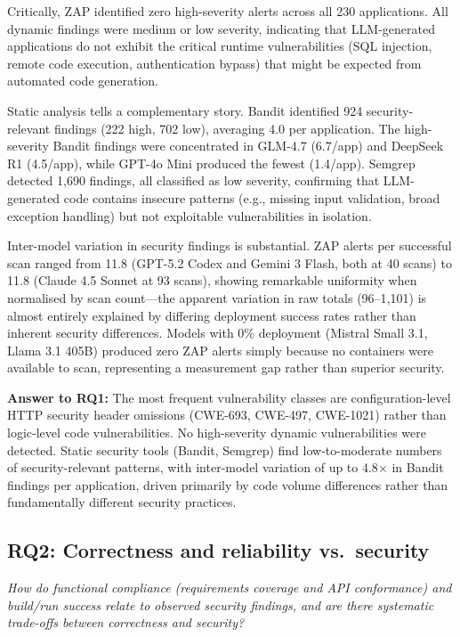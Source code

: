 Critically, ZAP identified zero high-severity alerts across all 230 applications. All dynamic findings were medium or low severity, indicating that LLM-generated applications do not exhibit the critical runtime vulnerabilities (SQL injection, remote code execution, authentication bypass) that might be expected from automated code generation.

Static analysis tells a complementary story. Bandit identified 924 security-relevant findings (222 high, 702 low), averaging 4.0 per application. The high-severity Bandit findings were concentrated in GLM-4.7 (6.7/app) and DeepSeek R1 (4.5/app), while GPT-4o Mini produced the fewest (1.4/app). Semgrep detected 1{,}690 findings, all classified as low severity, confirming that LLM-generated code contains insecure patterns (e.g., missing input validation, broad exception handling) but not exploitable vulnerabilities in isolation.

Inter-model variation in security findings is substantial. ZAP alerts per successful scan ranged from 11.8 (GPT-5.2 Codex and Gemini 3 Flash, both at 40 scans) to 11.8 (Claude 4.5 Sonnet at 93 scans), showing remarkable uniformity when normalised by scan count---the apparent variation in raw totals (96--1{,}101) is almost entirely explained by differing deployment success rates rather than inherent security differences. Models with 0\% deployment (Mistral Small 3.1, Llama 3.1 405B) produced zero ZAP alerts simply because no containers were available to scan, representing a measurement gap rather than superior security.

\textbf{Answer to RQ1:} The most frequent vulnerability classes are configuration-level HTTP security header omissions (CWE-693, CWE-497, CWE-1021) rather than logic-level code vulnerabilities. No high-severity dynamic vulnerabilities were detected. Static security tools (Bandit, Semgrep) find low-to-moderate numbers of security-relevant patterns, with inter-model variation of up to 4.8$\times$ in Bandit findings per application, driven primarily by code volume differences rather than fundamentally different security practices.

\subsection{RQ2: Correctness and reliability vs.\ security}

\textit{How do functional compliance (requirements coverage and API conformance) and build/run success relate to observed security findings, and are there systematic trade-offs between correctness and security?}

